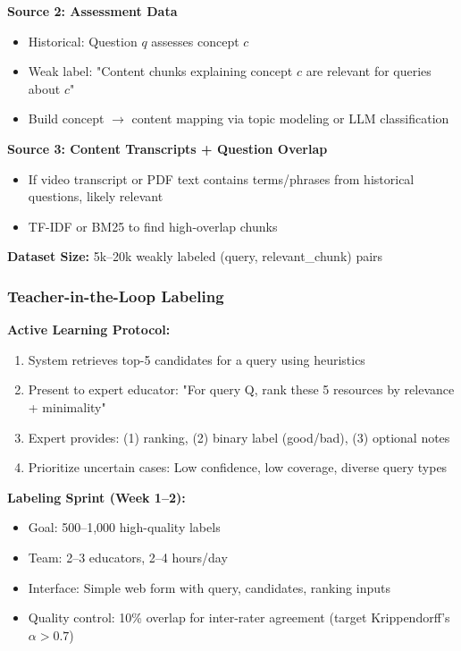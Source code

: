 \documentclass[11pt,letterpaper]{article}
\begin{document}
\textbf{Source 2: Assessment Data}
\begin{itemize}
\item Historical: Question $q$ assesses concept $c$
\item Weak label: "Content chunks explaining concept $c$ are relevant for queries about $c$"
\item Build concept $\rightarrow$ content mapping via topic modeling or LLM classification
\end{itemize}

\textbf{Source 3: Content Transcripts + Question Overlap}
\begin{itemize}
\item If video transcript or PDF text contains terms/phrases from historical questions, likely relevant
\item TF-IDF or BM25 to find high-overlap chunks
\end{itemize}

\textbf{Dataset Size:} 5k--20k weakly labeled (query, relevant\_chunk) pairs

\subsubsection{Teacher-in-the-Loop Labeling}\label{subsubsec:teacher-in-loop}

\textbf{Active Learning Protocol:}
\begin{enumerate}
\item System retrieves top-5 candidates for a query using heuristics
\item Present to expert educator: "For query Q, rank these 5 resources by relevance + minimality"
\item Expert provides: (1) ranking, (2) binary label (good/bad), (3) optional notes
\item Prioritize uncertain cases: Low confidence, low coverage, diverse query types
\end{enumerate}

\textbf{Labeling Sprint (Week 1--2):}
\begin{itemize}
\item Goal: 500--1,000 high-quality labels
\item Team: 2--3 educators, 2--4 hours/day
\item Interface: Simple web form with query, candidates, ranking inputs
\item Quality control: 10\% overlap for inter-rater agreement (target Krippendorff's $\alpha > 0.7$)
\end{itemize}
\end{document}
